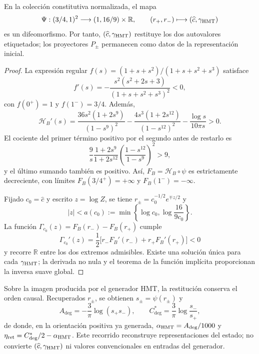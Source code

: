 \begin{theorem}
\label{v:thm:restitucion-c-gamma}
En la colección constitutiva normalizada, el mapa
\begin{equation}
 \Psi:(3/4,1)^2\longrightarrow(1,16/9)\times\mathbb R,
 \qquad
 (r_+,r_-)\longmapsto(\widehat c,\gamma_{\mathrm{HMT}})
 \label{v:eq:mapa-c-gamma}
\end{equation}
es un difeomorfismo. Por tanto, $(\widehat c,\gamma_{\mathrm{HMT}})$ restituye
los dos autovalores etiquetados; los proyectores $P_\pm$ permanecen como
datos de la representación inicial.
\end{theorem}
\begin{proof}
La expresión regular $f(s)=(1+s+s^2)/(1+s+s^2+s^3)$ satisface
\[
 f'(s)=-\frac{s^2(s^2+2s+3)}{(1+s+s^2+s^3)^2}<0,
\]
con $f(0^+)=1$ y $f(1^-)=3/4$. Además,
\begin{equation}
 \mathcal H_B'(s)=
 \frac{36s^2(1+2s^9)}{(1-s^9)^2}
 -\frac{4s^3(1+2s^{12})}{(1-s^{12})^2}
 -\frac{\log s}{10\pi s}>0.
 \label{v:eq:monotonia-hb}
\end{equation}
El cociente del primer término positivo por el segundo antes de restarlo
es
\[
 \frac9s\frac{1+2s^9}{1+2s^{12}}
 \left(\frac{1-s^{12}}{1-s^9}\right)^2>9,
\]
y el último sumando también es positivo. Así,
$F_B=\mathcal H_B\circ\psi$ es estrictamente decreciente, con límites
$F_B(3/4^+)=+\infty$ y $F_B(1^-)=-\infty$.

Fijado $c_0=\widehat c$ y escrito $z=\log\widehat Z$, se tiene
$r_\pm=c_0^{-1/2}e^{\mp z/2}$ y
\[
 |z|<a(c_0):=\min\!\left\{\log c_0,
 \log\frac{16}{9c_0}\right\}.
\]
La función $\Gamma_{c_0}(z)=F_B(r_-)-F_B(r_+)$ cumple
\[
 \Gamma_{c_0}'(z)=\frac12
 \bigl[r_-F_B'(r_-)+r_+F_B'(r_+)\bigr]<0
\]
y recorre $\mathbb R$ entre los dos extremos admisibles. Existe una
solución única para cada $\gamma_{\mathrm{HMT}}$; la derivada no nula y el teorema
de la función implícita proporcionan la inversa suave global.
\end{proof}

Sobre la imagen producida por el generador HMT, la restitución conserva
el orden causal. Recuperados $r_\pm$, se obtienen
$s_\pm=\psi(r_\pm)$ y
\begin{equation}
 A_{\deg}=-\frac3\pi\log(s_+s_-),\qquad
 C^*_{\deg}=\frac3\pi\log\frac{s_-}{s_+},
 \label{v:eq:restitucion-angular-constitutiva}
\end{equation}
de donde, en la orientación positiva ya generada,
$\alpha_{\mathrm{HMT}}=A_{\deg}/1000$ y
$\eta_{\mathrm{ret}}=C^*_{\deg}/2-\alpha_{\mathrm{HMT}}$. Este recorrido
reconstruye representaciones del estado; no convierte
$(\widehat c,\gamma_{\mathrm{HMT}})$ ni valores convencionales en entradas del
generador.

